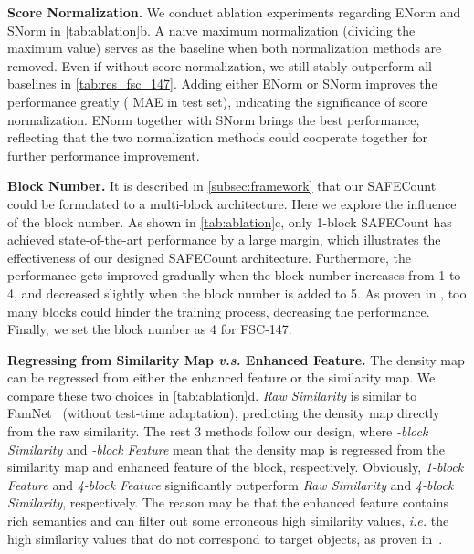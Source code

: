 \documentclass[10pt,twocolumn,letterpaper]{article}
\newcommand{\method}{SAFECount\xspace}
\begin{document}
\vspace{2pt}\noindent \textbf{Score Normalization.} 
We conduct ablation experiments regarding ENorm and SNorm in \cref{tab:ablation}b. 
A naive maximum normalization (dividing the maximum value) serves as the baseline when both normalization methods are removed. 
Even if without score normalization, we still stably outperform all baselines in \cref{tab:res_fsc_147}.  
Adding either ENorm or SNorm improves the performance greatly ( MAE in test set), indicating the significance of score normalization. 
ENorm together with SNorm brings the best performance, reflecting that the two normalization methods could cooperate together for further performance improvement. 


\vspace{2pt}\noindent \textbf{Block Number.} 
It is described in \cref{subsec:framework} that our \method could be formulated to a multi-block architecture. 
Here we explore the influence of the block number. 
As shown in \cref{tab:ablation}c, only 1-block \method has achieved state-of-the-art performance by a large margin, which illustrates the effectiveness of our designed \method architecture. 
Furthermore, the performance gets improved gradually when the block number increases from 1 to 4, and decreased slightly when the block number is added to 5. 
As proven in \cite{resnet}, too many blocks could hinder the training process, decreasing the performance. Finally, we set the block number as 4 for FSC-147. 


\vspace{-2pt} \noindent \textbf{Regressing from Similarity Map \textit{v.s.} Enhanced Feature.}  
The density map can be regressed from either the enhanced feature or the similarity map. 
We compare these two choices in \cref{tab:ablation}d. 
\textit{Raw Similarity} is similar to FamNet~\cite{famnet} (without test-time adaptation), predicting the density map directly from the raw similarity. 
The rest 3 methods follow our design, where \textit{-block Similarity} and \textit{-block Feature} mean that the density map is regressed from the similarity map and enhanced feature of the  block, respectively. 
Obviously, \textit{1-block Feature} and \textit{4-block Feature} significantly outperform \textit{Raw Similarity} and \textit{4-block Similarity}, respectively. 
The reason may be that the enhanced feature contains rich semantics and can filter out some erroneous high similarity values, \textit{i.e.} the high similarity values that do not correspond to target objects, as proven in~\cite{pwcnet}. 
\end{document}
